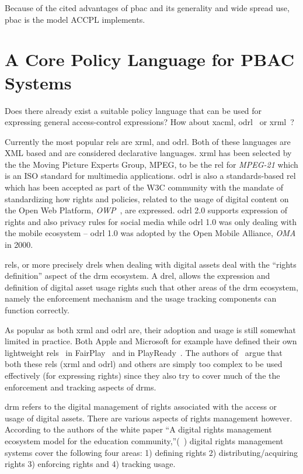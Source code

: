 Because of the cited advantages of \ac{pbac} and its generality and wide spread use, \ac{pbac} is the model \ac{ACCPL} implements.

\section{A Core Policy Language for PBAC Systems} 

Does there already exist a suitable policy language that can be used for expressing general access-control expressions? How about \ac{xacml}, \ac{odrl}~\cite{odrloneone} or \ac{xrml}~\cite{Wang}? 

Currently the most popular \ac{rel}s are \ac{xrml}, and \ac{odrl}. Both of these languages are XML based and are considered declarative languages. \ac{xrml} has been selected by the the Moving Picture Experts Group, MPEG, to be the \ac{rel} for \emph{MPEG-21} which is an ISO standard for multimedia applications. \ac{odrl} is also a standards-based \ac{rel} which has been accepted as part of the W3C community with the mandate of standardizing how rights and policies, related to the usage of digital content on the Open Web Platform, \emph{OWP}~\cite{openwebplatform}, are expressed. \ac{odrl} 2.0 supports expression of rights and also privacy rules for social media while \ac{odrl} 1.0 was only dealing with the mobile ecosystem -- \ac{odrl} 1.0 was adopted by the Open Mobile Alliance, \emph{OMA} in 2000.

\ac{rel}s, or more precisely \ac{drel}s when dealing with digital assets deal with the ``rights definition'' aspect of the \ac{drm} ecosystem. A \ac{drel}, allows the expression and definition of digital asset usage rights such that other areas of the \ac{drm} ecosystem, namely the enforcement mechanism and the usage tracking components can function correctly.

As popular as both \ac{xrml} and \ac{odrl} are, their adoption and usage is still somewhat limited in practice. Both Apple and Microsoft for example have defined their own lightweight \ac{rel}s~\cite{problemwithrels} in FairPlay~\cite{fairplay} and in PlayReady~\cite{playready}. The authors of~\cite{problemwithrels} argue that both these \ac{rel}s (\ac{xrml} and \ac{odrl}) and others are simply too complex to be used effectively (for expressing rights) since they also try to cover much of the the enforcement and tracking aspects of \ac{drm}s.

\ac{drm} refers to the digital management of rights associated with the access or usage of digital assets. There are various aspects of rights management however. According to the authors of the white paper ``A digital rights management ecosystem model for the education community,''(~\cite{collier})
 digital rights management systems cover the following four areas: 1) defining rights 2) distributing/acquiring rights 3) enforcing rights and 4) tracking usage.

